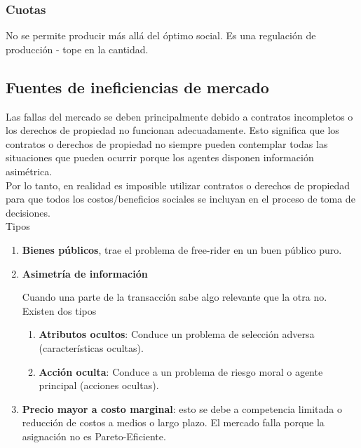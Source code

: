 \subsubsection{Cuotas}
No se permite producir más allá del óptimo social. Es una regulación de producción - tope en la cantidad.

\subsection{Fuentes de ineficiencias de mercado}
Las fallas del mercado se deben principalmente debido a contratos incompletos o los derechos de propiedad no funcionan adecuadamente. Esto significa que los contratos o derechos de propiedad no siempre pueden contemplar todas las situaciones que pueden ocurrir porque los agentes disponen información asimétrica.\\

Por lo tanto, en realidad es imposible utilizar contratos o derechos de propiedad para que todos los costos/beneficios sociales se incluyan en el proceso de toma de decisiones.\\


Tipos

\begin{enumerate}[label=\arabic*.]
    \item \textbf{Bienes públicos}, trae el problema de free-rider en un buen público puro.
    \item \textbf{Asimetría de información}
    

    Cuando una parte de la transacción sabe algo relevante que la otra no. Existen dos tipos
    
    \begin{enumerate}[label=\roman*.-]
        \item \textbf{Atributos ocultos}: Conduce un problema de selección adversa (características ocultas).
        \item \textbf{Acción oculta}: Conduce a un problema de riesgo moral o agente principal (acciones ocultas).
    \end{enumerate}

    \item \textbf{Precio mayor a costo marginal}: esto se debe a competencia limitada o reducción de costos a medios o largo plazo. El mercado falla porque la asignación no es Pareto-Eficiente.
    
\end{enumerate}


\newpage